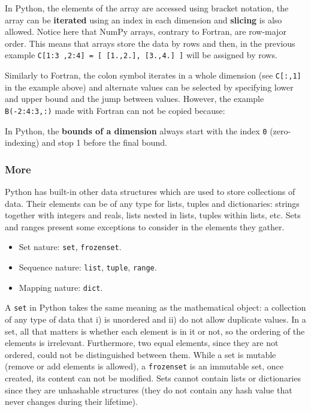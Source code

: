 In Python, the elements of the array are accessed using bracket notation, 
the array can be \textbf{iterated} using an index in each dimension and 
\textbf{slicing} is also allowed.
Notice here that NumPy arrays, contrary to Fortran, are row-major order. 
This means that arrays store the data by rows and then, in the previous example 
\texttt{C[1:3 ,2:4] = [ [1.,2.], [3.,4.] ]} will be assigned by rows. 

Similarly to Fortran, the colon symbol iterates in a whole dimension (see \texttt{C[:,1]} in the example above) and 
alternate values can be selected by specifying lower and upper bound and the jump between values.
However, the example \texttt{B(-2:4:3,:)} made with Fortran can not be copied because:
\begin{IN}
In Python, the \textbf{bounds of a dimension} always start with the index \texttt{0} (zero-indexing) and
stop 1 before the final bound.  
\end{IN}







            \subsubsection*{More}

\vspace{0.5cm}
Python has built-in other data structures which are used to store collections of data.
Their elements can be of any type for lists, tuples and dictionaries: 
strings together with integers and reals, 
lists nested in lists, tuples within lists, etc. 
Sets and ranges present some exceptions to consider in the elements they gather.
\vspace{-.5cm}
\begin{itemize}[noitemsep]    
    \item Set nature: \texttt{set}, \texttt{frozenset}.
    \item Sequence nature: \texttt{list}, \texttt{tuple}, \texttt{range}.
    \item Mapping nature: \texttt{dict}.
\end{itemize}
\vspace{-.5cm}

A \texttt{set} in Python takes the same meaning as the mathematical object: a collection of any type of data that 
i) is unordered and 
ii) do not allow duplicate values. 
In a set, all that matters is whether each element is in it or not, so the ordering of the elements is irrelevant.
Furthermore, two equal elements, since they are not ordered, could not be distinguished between them. 
While a set is mutable (remove or add elements is allowed), a \texttt{frozenset} is an immutable set, once created, its content can not be modified. 
Sets cannot contain lists or dictionaries since they are unhashable structures (they do not contain any hash value that never changes during their lifetime).

